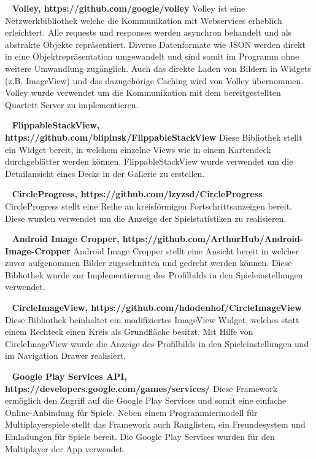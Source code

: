 \documentclass{scrartcl}
\begin{document}
\ \newline
\textbf{Volley, https://github.com/google/volley} \newline
Volley ist eine Netzwerkbibliothek welche die Kommunikation mit Webservices
erheblich erleichtert. Alle requests und responses werden asynchron behandelt
und als abstrakte Objekte repräsentiert. Diverse Datenformate wie JSON werden
direkt in eine Objektrepräsentation umgewandelt und sind somit im Programm ohne
weitere Umwandlung zugänglich. Auch das direkte Laden von Bildern in Widgets
(z.B. ImageView) und das dazugehörige Caching wird von Volley übernommen. Volley
wurde verwendet um die Kommunikation mit dem bereitgestellten Quartett Server zu
implementieren.

\ \newline
\textbf{FlippableStackView, https://github.com/blipinsk/FlippableStackView} \newline
Diese Bibliothek stellt ein Widget bereit, in welchem einzelne Views wie in
einem Kartendeck durchgeblätter werden können. FlippableStackView wurde
verwendet um die Detailansicht eines Decks in der Gallerie zu erstellen.

\ \newline
\textbf{CircleProgress, https://github.com/lzyzsd/CircleProgress} \newline
CircleProgress stellt eine Reihe an kreisförmigen Fortschrittsanzeigen bereit.
Diese wurden verwendet um die Anzeige der Spielstatistiken zu realisieren.

\ \newline
\textbf{Android Image Cropper, https://github.com/ArthurHub/Android-Image-Cropper} \newline
Android Image Cropper stellt eine Ansicht bereit in welcher zuvor aufgenommen
Bilder zugeschnitten und gedreht werden können. Diese Bibliothek wurde zur
Implementierung des Profilbilds in den Spieleinstellungen verwendet.

\ \newline
\textbf{CircleImageView, https://github.com/hdodenhof/CircleImageView} \newline
Diese Bibliothek beinhaltet ein modifiziertes ImageView Widget, welches statt
einem Rechteck einen Kreis als Grundfläche besitzt. Mit Hilfe von
CircleImageView wurde die Anzeige des Profilbilds in den Spieleinstellungen und
im Navigation Drawer realisiert.

\ \newline
\textbf{Google Play Services API, https://developers.google.com/games/services/} \newline
Diese Framework ermöglich den Zugriff auf die Google Play Services und somit
eine einfache Online-Anbindung für Spiele. Neben einem Programmiermodell für
Multiplayerspiele stellt das Framework auch Ranglisten, ein Freundesystem und
Einladungen für Spiele bereit. Die Google Play Services wurden für den
Multiplayer der App verwendet.
\end{document}
